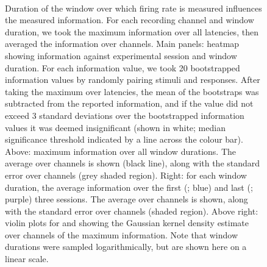 \begin{figure}[htbp]%
    \centering
    \hspace*{\fill}
    \hspace*{\fill}\hspace{.2cm}\hspace*{\fill}
    \hspace*{\fill}
    \\
    \hspace*{\fill}
    \hspace*{\fill}\hspace{.2cm}\hspace*{\fill}
    \hspace*{\fill}
    \caption{Duration of the window over which firing rate is measured influences the measured information.
For each recording channel and window duration, we took the maximum information over all latencies, then averaged the information over channels.
Main panels: heatmap showing information against experimental session and window duration.
For each information value, we took \num{20} bootstrapped information values by randomly pairing stimuli and responses.
After taking the maximum over latencies, the mean of the bootstraps was subtracted from the reported information, and if the value did not exceed \num{3} standard deviations over the bootstrapped information values it was deemed insignificant (shown in white; median significance threshold indicated by a line across the colour bar).
Above: maximum information over all window durations.
The average over channels is shown (black line), along with the standard error over channels (grey shaded region).
Right: for each window duration, the average information over the first (; blue) and last (; purple) three sessions.
The average over channels is shown, along with the standard error over channels (shaded region).
Above right: violin plots for  and  showing the Gaussian kernel density estimate over channels of the maximum information.
Note that window durations were sampled logarithmically, but are shown here on a linear scale.
    \label{fig:info_winlen}
}
\end{figure}


